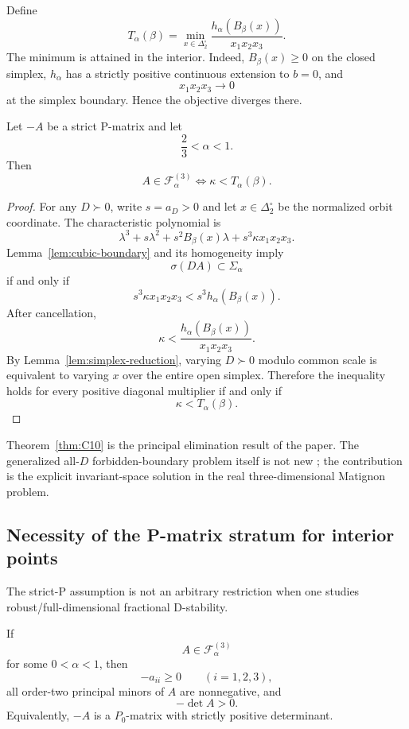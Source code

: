 Define
\[
\boxed{
T_\alpha(\beta)
=
\min_{x\in\Delta_2^\circ}
\frac{
h_\alpha(B_\beta(x))
}{
x_1x_2x_3
}.
}
\]
The minimum is attained in the interior. Indeed, \(B_\beta(x)\ge0\) on the closed simplex, \(h_\alpha\) has a strictly positive continuous extension to \(b=0\), and
\[
x_1x_2x_3\to0
\]
at the simplex boundary. Hence the objective diverges there.

\begin{theorem}
\label{thm:C10}
Let \(-A\) be a strict P-matrix and let
\[
\frac23<\alpha<1.
\]
Then
\[
\boxed{
A\in\mathcal F_\alpha^{(3)}
\iff
\kappa<T_\alpha(\beta).
}
\]
\end{theorem}

\begin{proof}
For any \(D\succ0\), write \(s=a_D>0\) and let \(x\in\Delta_2^\circ\) be the normalized orbit coordinate. The characteristic polynomial is
\[
\lambda^3+s\lambda^2+s^2B_\beta(x)\lambda
+s^3\kappa x_1x_2x_3.
\]
Lemma~\ref{lem:cubic-boundary} and its homogeneity imply
\[
\sigma(DA)\subset\Sigma_\alpha
\]
if and only if
\[
s^3\kappa x_1x_2x_3
<
s^3 h_\alpha(B_\beta(x)).
\]
After cancellation,
\[
\kappa
<
\frac{h_\alpha(B_\beta(x))}{x_1x_2x_3}.
\]
By Lemma~\ref{lem:simplex-reduction}, varying \(D\succ0\) modulo common scale is equivalent to varying \(x\) over the entire open simplex. Therefore the inequality holds for every positive diagonal multiplier if and only if
\[
\kappa<T_\alpha(\beta).
\]
\end{proof}

Theorem~\ref{thm:C10} is the principal elimination result of the paper. The generalized all-\(D\) forbidden-boundary problem itself is not new \citep{Kushel2019,KushelPavani2022}; the contribution is the explicit invariant-space solution in the real three-dimensional Matignon problem.

\subsection{Necessity of the P-matrix stratum for interior points}

The strict-P assumption is not an arbitrary restriction when one studies robust/full-dimensional fractional D-stability.

\begin{lemma}[\(P_0\) necessity]
\label{lem:P0}
If
\[
A\in\mathcal F_\alpha^{(3)}
\]
for some \(0<\alpha<1\), then
\[
-a_{ii}\ge0
\qquad(i=1,2,3),
\]
all order-two principal minors of \(A\) are nonnegative, and
\[
-\det A>0.
\]
Equivalently, \(-A\) is a \(P_0\)-matrix with strictly positive determinant.
\end{lemma}

